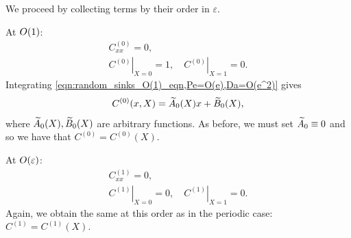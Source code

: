 We proceed by collecting terms by their order in \(\varepsilon\).

At \(O(1)\):
\begin{subequations}
    \label{eqn:random_sinks_O(1),Pe=O(e),Da=O(e^2)}
    \begin{gather}
        \label{eqn:random_sinks_O(1)_eqn,Pe=O(e),Da=O(e^2)}
        C^{(0)}_{xx} = 0,\\
        \label{eqn:random_sinks_O(1)_bcs,Pe=O(e),Da=O(e^2)}
        \left.C^{(0)}\right|_{X=0}=1, \quad \left.C^{(0)}\right|_{X=1}=0.
    \end{gather}
\end{subequations}
Integrating \eqref{eqn:random_sinks_O(1)_eqn,Pe=O(e),Da=O(e^2)} gives
\begin{equation}
    \label{}
    C^{(0)}(x,X) = \widetilde{A}_0(X)x + \widetilde{B}_0(X),
\end{equation}
where \(\widetilde{A}_0(X),\widetilde{B}_0(X)\) are arbitrary functions. As before, we must
set \(\widetilde{A}_0 \equiv 0\) and so we have that \(C^{(0)} = C^{(0)}(X)\).

At \(O(\varepsilon)\):
\begin{subequations}
    \label{eqn:random_sinks_O(e),Pe=O(e),Da=O(e^2)}
    \begin{gather}
        \label{eqn:random_sinks_O(e)_eqn,Pe=O(e),Da=O(e^2)}
        C^{(1)}_{xx} = 0,\\
        \label{eqn:random_sinks_O(e)_bcs,Pe=O(e),Da=O(e^2)}
        \left.C^{(1)}\right|_{X=0}=0, \quad \left.C^{(1)}\right|_{X=1}=0.
    \end{gather}
\end{subequations}
Again, we obtain the same at this order as in the periodic case: \(C^{(1)} =
C^{(1)}(X)\).

